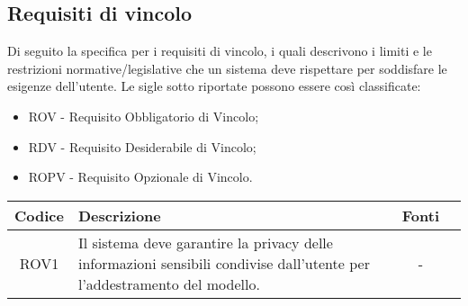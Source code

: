 \documentclass[10pt, a4paper]{article}
\begin{document}
\subsection{Requisiti di vincolo}
Di seguito la specifica per i requisiti di vincolo, i quali descrivono i limiti e le restrizioni normative/legislative che un sistema
deve rispettare per soddisfare le esigenze dell'utente.
Le sigle sotto riportate possono essere così classificate:
\begin{itemize}
    \item ROV - Requisito Obbligatorio di Vincolo;
    \item RDV - Requisito Desiderabile di Vincolo;
    \item ROPV - Requisito Opzionale di Vincolo. 
\end{itemize}
\renewcommand{\arraystretch}{1.5}
\begin{tabularx}{\textwidth}{|c|X|c|c}\hline
\textbf{Codice} & \textbf{Descrizione} & \textbf{Fonti} \\
\hline
ROV1 & Il sistema deve garantire la privacy delle informazioni sensibili condivise dall'utente per l'addestramento del modello. & - \\

\hline

\end{tabularx}
\end{document}

